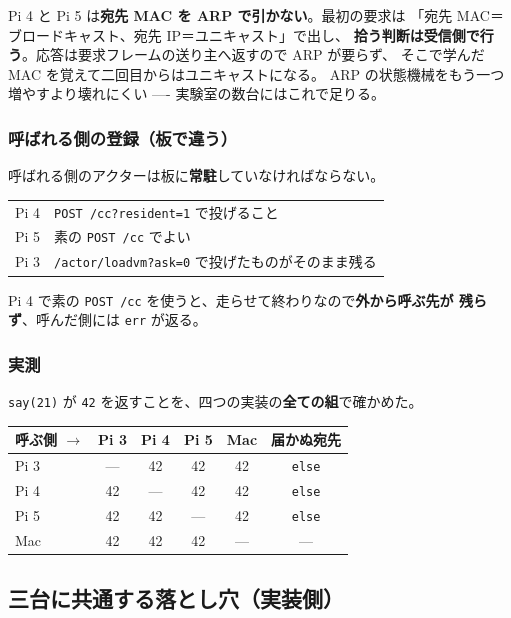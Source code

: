 \documentclass[11pt,a4paper]{ltjsarticle}
\begin{document}
Pi 4 と Pi 5 は\textbf{宛先 MAC を ARP で引かない}。最初の要求は
「宛先 MAC＝ブロードキャスト、宛先 IP＝ユニキャスト」で出し、
\textbf{拾う判断は受信側で行う}。応答は要求フレームの送り主へ返すので ARP が要らず、
そこで学んだ MAC を覚えて二回目からはユニキャストになる。
ARP の状態機械をもう一つ増やすより壊れにくい ---- 実験室の数台にはこれで足りる。

\subsubsection*{呼ばれる側の登録（板で違う）}

呼ばれる側のアクターは板に\textbf{常駐}していなければならない。

\begin{center}
\small
\begin{tabular}{@{}ll@{}}
\toprule
Pi 4 & \texttt{POST /cc?resident=1} で投げること \\
Pi 5 & 素の \texttt{POST /cc} でよい \\
Pi 3 & \texttt{/actor/loadvm?ask=0} で投げたものがそのまま残る \\
\bottomrule
\end{tabular}
\end{center}

Pi 4 で素の \texttt{POST /cc} を使うと、走らせて終わりなので\textbf{外から呼ぶ先が
残らず}、呼んだ側には \texttt{err} が返る。

\subsubsection*{実測}

\texttt{say(21)} が \texttt{42} を返すことを、四つの実装の\textbf{全ての組}で確かめた。

\begin{center}
\small
\begin{tabular}{@{}lccccc@{}}
\toprule
呼ぶ側 $\rightarrow$ & Pi 3 & Pi 4 & Pi 5 & Mac & 届かぬ宛先 \\
\midrule
Pi 3 & --- & 42 & 42 & 42 & \texttt{else} \\
Pi 4 & 42 & --- & 42 & 42 & \texttt{else} \\
Pi 5 & 42 & 42 & --- & 42 & \texttt{else} \\
Mac  & 42 & 42 & 42 & --- & --- \\
\bottomrule
\end{tabular}
\end{center}

\subsection{三台に共通する落とし穴（実装側）}
\label{sec:three-boards-traps}
\end{document}
